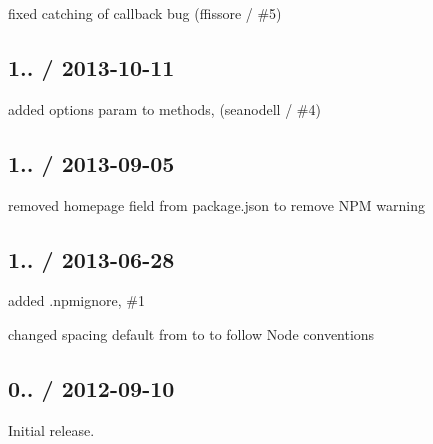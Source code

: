 \begin{DoxyItemize}
\item fixed catching of callback bug (ffissore / \#5)
\end{DoxyItemize}

\subsection*{1.. / 2013-\/10-\/11 }


\begin{DoxyItemize}
\item added {\ttfamily options} param to methods, (seanodell / \#4)
\end{DoxyItemize}

\subsection*{1.. / 2013-\/09-\/05 }


\begin{DoxyItemize}
\item removed {\ttfamily homepage} field from package.\+json to remove N\+PM warning
\end{DoxyItemize}

\subsection*{1.. / 2013-\/06-\/28 }


\begin{DoxyItemize}
\item added {\ttfamily .npmignore}, \#1
\item changed spacing default from {} to {} to follow Node conventions
\end{DoxyItemize}

\subsection*{0.. / 2012-\/09-\/10 }


\begin{DoxyItemize}
\item Initial release. 
\end{DoxyItemize}
